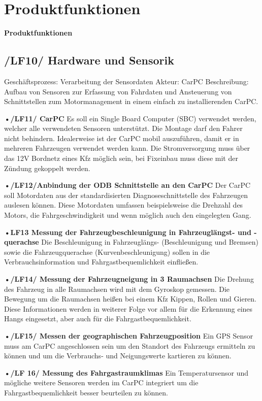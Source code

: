 \chapter{Produktfunktionen}

\textbf{Produktfunktionen}
\section{/LF10/ Hardware und Sensorik}
Geschäftsprozess:	Verarbeitung der Sensordaten
Akteur:			CarPC
Beschreibung:	Aufbau von Sensoren zur Erfassung von Fahrdaten und Ansteuerung von Schnittstellen zum Motormanagement in einem einfach zu installierenden CarPC.

\textbf{•/LF11/ CarPC}
\nextline
Es soll ein Single Board Computer (SBC) verwendet werden, welcher alle verwendeten Sensoren unterstützt. Die Montage darf den Fahrer nicht behindern. Idealerweise ist der CarPC mobil auszuführen, damit er in mehreren Fahrzeugen verwendet werden kann. Die Stromversorgung muss über das 12V Bordnetz eines Kfz möglich sein, bei Fixeinbau muss diese mit der Zündung gekoppelt werden.

\textbf{•/LF12/Anbindung der ODB Schnittstelle an den CarPC}
\nextline
Der CarPC soll Motordaten aus der standardisierten Diagnoseschnittstelle des Fahrzeugen auslesen können. Diese Motordaten umfassen beispielsweise die Drehzahl des Motors, die Fahrgeschwindigkeit und wenn möglich auch den eingelegten Gang.

\textbf{•LF13 Messung der Fahrzeugbeschleunigung in Fahrzeuglängst- und -querachse}
\nextline
Die Beschleunigung in Fahrzeuglängs- (Beschleunigung und Bremsen) sowie die Fahrzeugquerachse (Kurvenbeschleunigung) sollen in die Verbrauchsinformation und Fahrgastbequemlichkeit einfließen.

\newpage
\textbf{•/LF14/ Messung der Fahrzeugneigung in 3 Raumachsen}
\nextline
Die Drehung des Fahrzeug in alle Raumachsen wird mit dem Gyroskop gemessen. Die Bewegung um die Raumachsen heißen bei einem Kfz Kippen, Rollen und Gieren. Diese Informationen werden in weiterer Folge vor allem für die Erkennung eines Hangs eingesetzt, aber auch für die Fahrgastbequemlichkeit.

\textbf{•/LF15/ Messen der geographischen Fahrzeugposition}
\nextline
Ein GPS Sensor muss am CarPC angeschlossen sein um den Standort des Fahrzeugs ermitteln zu können und um die Verbrauchs- und Neigungswerte kartieren zu können.

\textbf{•/LF 16/ Messung des Fahrgastraumklimas}
\nextline
Ein Temperatursensor und mögliche weitere Sensoren werden im CarPC integriert um die Fahrgastbequemlichkeit besser beurteilen zu können.


